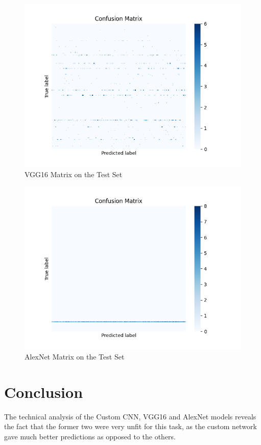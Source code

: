 \documentclass{article}
\begin{document}
\begin{figure}[hbt!]
	\centering
	\includegraphics[scale=0.58]{../conf_matrices/vgg16_conf_matrix.png}
	\caption{VGG16 Matrix on the Test Set}
\end{figure}

\begin{figure}[hbt!]
	\centering
	\includegraphics[scale=0.58]{../conf_matrices/alexnet_conf_matrix.png}
	\caption{AlexNet Matrix on the Test Set}
\end{figure}

\newpage 

\section{Conclusion}
The technical analysis of the Custom CNN, VGG16 and AlexNet models reveals the fact that the former two were very unfit for this task, as the custom network gave much better predictions as opposed to the others.
\end{document}
